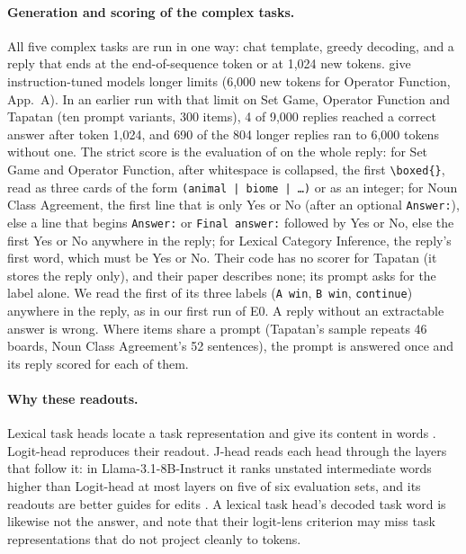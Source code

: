 \documentclass[11pt,a4paper]{article}
\begin{document}
\paragraph{Generation and scoring of the complex tasks.}\label{sec:reasoning} All five complex tasks are run in one way: chat template, greedy decoding, and a reply that ends at the end-of-sequence token or at 1,024 new tokens. \citeauthor{fu2026rules} give instruction-tuned models longer limits (6,000 new tokens for Operator Function, App.~A). In an earlier run with that limit on Set Game, Operator Function and Tapatan (ten prompt variants, 300 items), 4 of 9,000 replies reached a correct answer after token 1,024, and 690 of the 804 longer replies ran to 6,000 tokens without one. The strict score is the evaluation of \citet{fu2026rules} on the whole reply: for Set Game and Operator Function, after whitespace is collapsed, the first \texttt{\textbackslash boxed\{\}}, read as three cards of the form \texttt{(animal | biome | \ldots)} or as an integer; for Noun Class Agreement, the first line that is only Yes or No (after an optional \texttt{Answer:}), else a line that begins \texttt{Answer:} or \texttt{Final answer:} followed by Yes or No, else the first Yes or No anywhere in the reply; for Lexical Category Inference, the reply's first word, which must be Yes or No. Their code has no scorer for Tapatan (it stores the reply only), and their paper describes none; its prompt asks for the label alone. We read the first of its three labels (\texttt{A win}, \texttt{B win}, \texttt{continue}) anywhere in the reply, as in our first run of E0. A reply without an extractable answer is wrong. Where items share a prompt (Tapatan's sample repeats 46 boards, Noun Class Agreement's 52 sentences), the prompt is answered once and its reply scored for each of them.

\paragraph{Why these readouts.} Lexical task heads locate a task representation and give its content in words \citep{yang2026shared}. Logit-head reproduces their readout. J-head reads each head through the layers that follow it: in Llama-3.1-8B-Instruct it ranks unstated intermediate words higher than Logit-head at most layers on five of six evaluation sets, and its readouts are better guides for edits \citep[Secs.~3--4]{merlo2026headjlens}. A lexical task head's decoded task word is likewise not the answer, and \citet[Sec.~4]{yang2026shared} note that their logit-lens criterion may miss task representations that do not project cleanly to tokens.
\end{document}
